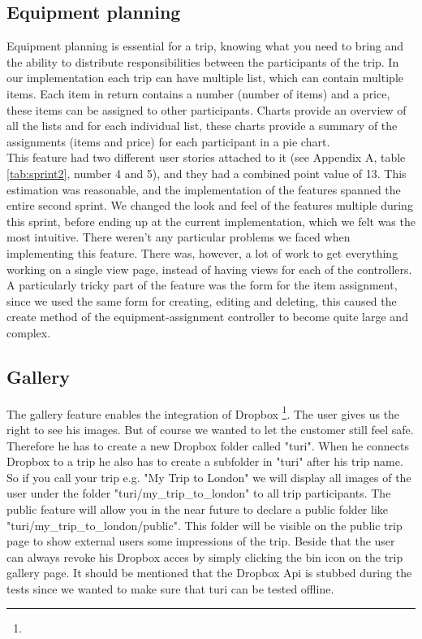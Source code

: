 \documentclass[a4paper]{article}
\begin{document}
\subsection{Equipment planning}
Equipment planning is essential for a trip, knowing what you need to bring and the ability to distribute responsibilities between the participants of the trip. In our implementation each trip can have multiple list, which can contain multiple items. Each item in return contains a number (number of items) and a price, these items can be assigned to other participants. Charts provide an overview of all the lists and for each individual list, these charts provide a summary of the assignments (items and price) for each participant in a pie chart. \\ This feature had two different user stories attached to it (see Appendix A, table \ref{tab:sprint2}, number 4 and 5), and they had a combined point value of 13. This estimation was reasonable, and the implementation of the features spanned the entire second sprint. We changed the look and feel of the features multiple during this sprint, before ending up at the current implementation, which we felt was the most intuitive. There weren't any particular problems we faced when implementing this feature. There was, however, a lot of work to get everything working on a single view page, instead of having views for each of the controllers. A particularly tricky part of the feature was the form for the item assignment, since we used the same form for creating, editing and deleting, this caused the create method of the equipment-assignment controller to become quite large and complex. 

\subsection{Gallery}
The gallery feature enables the integration of Dropbox \footnote{\DROPBOX}. The user gives us the right to see his images. But of course we wanted to let the customer still feel safe. Therefore he has to create a new Dropbox folder called "turi". When he connects Dropbox to a trip he also has to create a subfolder in "turi" after his trip name. So if you call your trip e.g. "My Trip to London" we will display all images of the user under the folder "turi/my\_trip\_to\_london" to all trip participants. The public feature will allow you in the near future to declare a public folder like "turi/my\_trip\_to\_london/public". This folder will be visible on the public trip page to show external users some impressions of the trip. Beside that the user can always revoke his Dropbox acces by simply clicking the bin icon on the trip gallery page. It should be mentioned that the Dropbox Api is stubbed during the tests since we wanted to make sure that turi can be tested offline.
\end{document}
